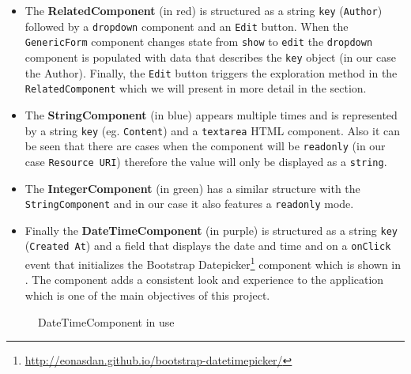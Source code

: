 \begin{itemize}
	\item The \textbf{RelatedComponent} (in red) is structured as a string \texttt{key} (\texttt{Author}) followed by a \texttt{dropdown} component and an \texttt{Edit} button. When the \texttt{GenericForm} component changes state from \texttt{show} to \texttt{edit} the \texttt{dropdown} component is populated with data that describes the \texttt{key} object (in our case the Author). Finally, the \texttt{Edit} button triggers the exploration method in the \texttt{RelatedComponent} which we will present in more detail in the  section.
	\item The \textbf{StringComponent} (in blue) appears multiple times and is represented by a string \texttt{key} (eg. \texttt{Content}) and a \texttt{textarea} HTML component. Also it can be seen that there are cases when the component will be \texttt{readonly} (in our case \texttt{Resource URI}) therefore the value will only be displayed as a \texttt{string}.
	\item The \textbf{IntegerComponent} (in green) has a similar structure with the \texttt{StringComponent} and in our case it also features a \texttt{readonly} mode.
	\item Finally the \textbf{DateTimeComponent} (in purple) is structured as a string \texttt{key} (\texttt{Created At}) and a field that displays the date and time and on a \texttt{onClick} event that initializes the Bootstrap Datepicker\footnote{\url{http://eonasdan.github.io/bootstrap-datetimepicker/}} component which is shown in . The component adds a consistent look and experience to the application which is one of the main objectives of this project.
\end{itemize}
\begin{figure}[H]
	\centering
	\caption{DateTimeComponent in use\label{img:date-time-panel}}
\end{figure}


